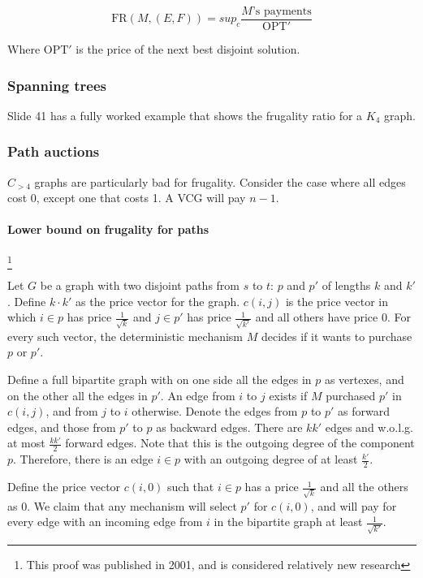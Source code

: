 \documentclass{idc_msc}
\begin{document}
\[\text{FR}(M, (E, F)) = sup_c \frac{\text{\(M\)'s payments}}{\text{OPT}'}\]

Where \(\text{OPT}'\) is the price of the next best disjoint solution.

\subsubsection{Spanning trees}

Slide 41 has a fully worked example that shows the frugality ratio for a \(K_4\) graph.

\subsubsection{Path auctions}

\(C_{>4}\) graphs are particularly bad for frugality.
Consider the case where all edges cost 0, except one that costs 1.
A VCG will pay \(n-1\).

\paragraph{Lower bound on frugality for paths}
\footnote{This proof was published in 2001, and is considered relatively new research}

Let \(G\) be a graph with two disjoint paths from \(s\) to \(t\): \(p\) and \(p'\) of lengths \(k\) and \(k'\).
Define \(k \cdot k'\) as the price vector for the graph.
\(c(i,j)\) is the price vector in which \(i \in p\) has price \(\frac{1}{\sqrt{k}}\) and \(j \in p'\) has price \(\frac{1}{\sqrt{k'}}\) and all others have price 0.
For every such vector, the deterministic mechanism \(M\) decides if it wants to purchase \(p\) or \(p'\).

Define a full bipartite graph with on one side all the edges in \(p\) as vertexes, and on the other all the edges in \(p'\).
An edge from \(i\) to \(j\) exists if \(M\) purchased \(p'\) in \(c(i,j)\), and from \(j\) to \(i\) otherwise.
Denote the edges from \(p\) to \(p'\) as forward edges, and those from \(p'\) to \(p\) as backward edges.
There are \(kk'\) edges and w.o.l.g. at most \(\frac{kk'}{2}\) forward edges.
Note that this is the outgoing degree of the component \(p\).
Therefore, there is an edge \(i \in p\) with an outgoing degree of at least \(\frac{k'}{2}\).

Define the price vector \(c(i,0)\) such that \(i \in p\) has a price \(\frac{1}{\sqrt{k}}\) and all the others as 0.
We claim that any mechanism will select \(p'\) for \(c(i,0)\), and will pay for every edge with an incoming edge from \(i\) in the bipartite graph at least \(\frac{1}{\sqrt{k'}}\).
\end{document}
